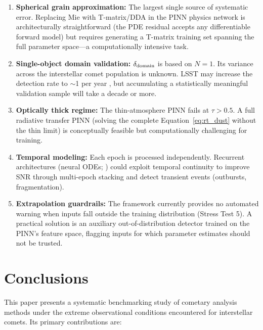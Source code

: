 \documentclass[preprint2]{aastex631}
\begin{document}
\begin{enumerate}
    \item \textbf{Spherical grain approximation:} The largest single source of systematic error. Replacing Mie with T-matrix/DDA in the PINN physics network is architecturally straightforward (the PDE residual accepts any differentiable forward model) but requires generating a T-matrix training set spanning the full parameter space---a computationally intensive task.
    \item \textbf{Single-object domain validation:} $\delta_{\rm domain}$ is based on $N=1$. Its variance across the interstellar comet population is unknown. LSST may increase the detection rate to $\sim$1 per year \citep{jones18}, but accumulating a statistically meaningful validation sample will take a decade or more.
    \item \textbf{Optically thick regime:} The thin-atmosphere PINN fails at $\tau > 0.5$. A full radiative transfer PINN (solving the complete Equation~\ref{eq:rt_dust} without the thin limit) is conceptually feasible but computationally challenging for training.
    \item \textbf{Temporal modeling:} Each epoch is processed independently. Recurrent architectures (neural ODEs; \citealt{chen18}) could exploit temporal continuity to improve SNR through multi-epoch stacking and detect transient events (outbursts, fragmentation).
    \item \textbf{Extrapolation guardrails:} The framework currently provides no automated warning when inputs fall outside the training distribution (Stress Test 5). A practical solution is an auxiliary out-of-distribution detector trained on the PINN's feature space, flagging inputs for which parameter estimates should not be trusted.
\end{enumerate}

\section{Conclusions}\label{sec:conclusions}

This paper presents a systematic benchmarking study of cometary analysis methods under the extreme observational conditions encountered for interstellar comets. Its primary contributions are:
\end{document}

